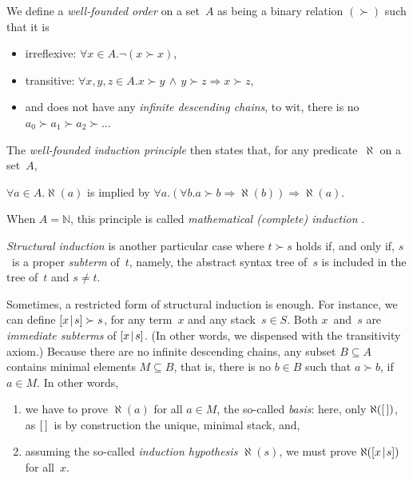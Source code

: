We define a \emph{well\hyp{}founded order}
\citep{Winskel_1993} on a
set~\(A\) as being a binary relation \((\succ)\) such that it is
\begin{itemize}

  \item irreflexive: \(\forall x \in A. \neg(x \succ x)\),

  \item transitive: \(\forall x, y, z \in A. x \succ y \,\wedge\, y
    \succ z \Rightarrow x \succ z\),

  \item and does not have any \emph{infinite descending
  chains}, to wit, there is
    no \(a_0 \succ a_1 \succ a_2 \succ \dots\)

\end{itemize}
The \emph{well\hyp{}founded induction principle} then states that, for
any predicate~\(\aleph\) on a set~\(A\),
\begin{center}
  \(\forall a \in A.\aleph(a)\) is implied by \(\forall a.(\forall b.a
  \succ b \Rightarrow \aleph(b)) \Rightarrow \aleph(a)\).
\end{center}
When \(A=\mathbb{N}\), this principle is called \emph{mathematical
(complete) induction} \citep{Buck_1963}.

\emph{Structural induction} is
another particular case where \(t \succ s\) holds if, and only if,
\(s\)~is a proper \emph{subterm} of~\(t\), namely, the abstract syntax tree of~\(s\) is
included in the tree of~\(t\) and \(s \neq t\).

Sometimes, a restricted form of structural induction is enough. For
instance, we can define \([{x}\!\mid\!{s}] \succ
s\), for any term~\(x\) and any stack~\(s \in
S\). Both \(x\)~and~\(s\) are \emph{immediate
subterms} of
\([{x}\!\mid\!{s}]\). (In other words, we
dispensed with the transitivity axiom.) Because there are no infinite
descending chains, any subset \(B \subseteq A\) contains minimal
elements \(M \subseteq B\), that is, there is no \(b \in B\) such that
\(a \succ b\), if \(a \in M\). In other words,
\begin{enumerate}

  \item we have to prove \(\aleph(a)\) for all \(a \in M\), the
    so\hyp{}called \emph{basis}: here, only \(\aleph([\,])\), as
    \([\,]\)~is by construction the unique, minimal stack, and,

  \item assuming the so\hyp{}called \emph{induction hypothesis}
    \(\aleph(s)\), we must prove \(\aleph([{x}\!\mid\!{s}])\) for
    all~\(x\).

\end{enumerate}

